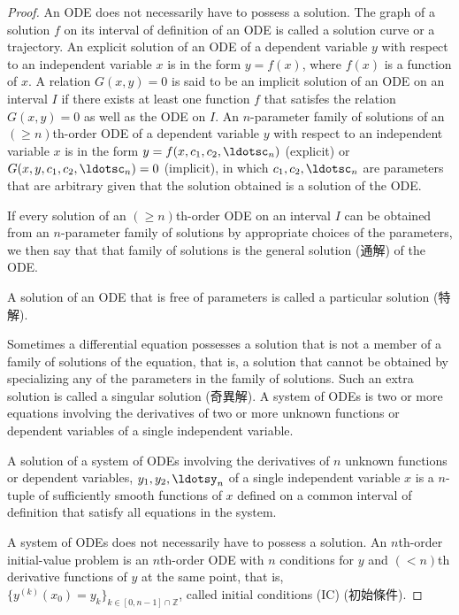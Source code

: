 \documentclass[a4paper,12pt]{report}
\begin{document}
\begin{proof}
{{{{{{An ODE does not necessarily have to possess a solution.
The graph of a solution $f$ on its interval of definition of an ODE is called a solution curve or a trajectory.
An explicit solution of an ODE of a dependent variable $y$ with respect to an independent variable $x$ is in the form $y=f(x)$, where $f(x)$ is a function of $x$.
A relation $G(x, y) = 0$ is said to be an implicit solution of an ODE on an interval $I$ if there exists at least one function $f$ that satisfes the relation $G(x, y) = 0$ as well as the ODE on $I$.
An $n$-parameter family of solutions of an $(\geq n)$th-order ODE of a dependent variable $y$ with respect to an independent variable $x$ is in the form $y=f(x,c_1,c_2,\ldotsc_n)$ (explicit) or $G(x,y,c_1,c_2,\ldotsc_n)=0$ (implicit), in which $c_1,c_2,\ldotsc_n$ are parameters that are arbitrary given that the solution obtained is a solution of the ODE.

If every solution of an $(\geq n)$th-order ODE on an interval $I$ can be obtained from an $n$-parameter family of solutions by appropriate choices of the parameters, we then say that that family of solutions is the general solution (通解) of the ODE.

A solution of an ODE that is free of parameters is called a particular solution (特解).

Sometimes a differential equation possesses a solution that is not a member of a family of solutions of the equation, that is, a solution that cannot be obtained by specializing any of the parameters in the family of solutions. Such an extra solution is called a singular solution (奇異解).
A system of ODEs is two or more equations involving the derivatives of two or more unknown functions or dependent variables of a single independent variable.

A solution of a system of ODEs involving the derivatives of $n$ unknown functions or dependent variables, $y_1,y_2,\ldotsy_n$ of a single independent variable $x$ is a $n$-tuple of sufficiently smooth functions of $x$ defined on a common interval of definition that satisfy all equations in the system.

A system of ODEs does not necessarily have to possess a solution.
An $n$th-order initial-value problem is an $n$th-order ODE with $n$ conditions for $y$ and $(<n)$th derivative functions of $y$ at the same point, that is, $\{y^{(k)}(x_0)=y_k\}_{k\in[0,n-1]\cap\mathbb{Z}}$, called initial conditions (IC) (初始條件).

}}}}}}
\end{proof}
\end{document}
